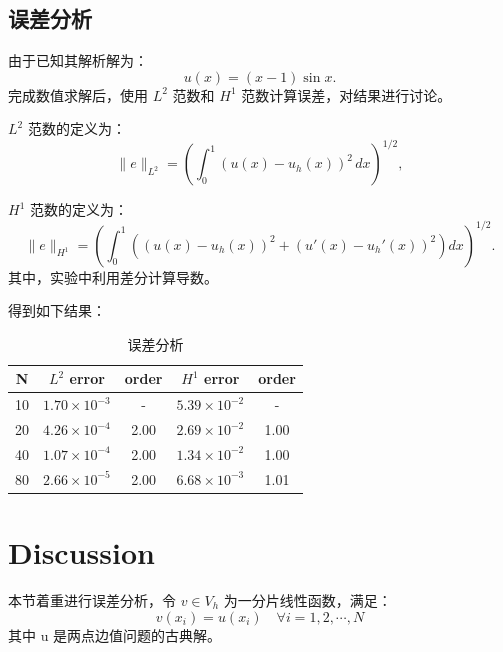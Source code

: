 \documentclass[11pt]{ctexart}
\begin{document}
\subsection{误差分析}
由于已知其解析解为：
\begin{equation}
    u(x) = (x - 1) \sin x.
\end{equation}
完成数值求解后，使用 $L^2$ 范数和 $H^1$ 范数计算误差，对结果进行讨论。

$L^2$ 范数的定义为：
\begin{equation}
    \| e \|_{L^2} = \left( \int_0^1 (u(x) - u_h(x))^2 \, dx \right)^{1/2},
\end{equation}

$H^1$ 范数的定义为：
\begin{equation}
    \| e \|_{H^1} = \left( \int_0^1 \left( (u(x) - u_h(x))^2 + (u'(x) - u_h'(x))^2 \right) dx \right)^{1/2}.
\end{equation}
其中，实验中利用差分计算导数。

得到如下结果：

\begin{table}[htbp]
	\centering
	\caption{误差分析}
	  \begin{tabular}{|c|cc|cc|}
	  \toprule
	  N     & \multicolumn{1}{c}{$L^2$ error} & \multicolumn{1}{c|}{order} & \multicolumn{1}{c}{$H^1$ error} & \multicolumn{1}{c|}{order} \\
	  \midrule
	  10    & $1.70\times 10^{-3}$ &   -    & $5.39\times 10^{-2}$ & - \\
	  20    & $4.26\times 10^{-4}$ & 2.00 & $2.69\times 10^{-2}$ & 1.00 \\
	  40    & $1.07\times 10^{-4}$ & 2.00 & $1.34\times 10^{-2}$ & 1.00 \\
	  80    & $2.66\times 10^{-5}$ & 2.00 & $6.68\times 10^{-3}$ & 1.01 \\
	  \bottomrule
	  \end{tabular}%
	\label{tab:error}%
  \end{table}%
  
\section{Discussion}
本节着重进行误差分析，令 $ v\in V_h $ 为一分片线性函数，满足：
\begin{equation}
	v(x_i) = u(x_i)\quad \forall i = 1,2,\cdots,N
\end{equation}
其中 u 是两点边值问题的古典解。
\end{document}
